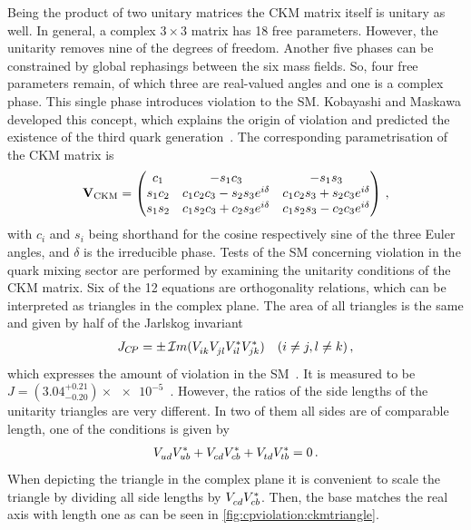 Being the product of two unitary matrices the CKM matrix itself is unitary as
well. In general, a complex $3\times3$ matrix has 18 free parameters. However,
the unitarity removes nine of the degrees of freedom. Another five phases can
be constrained by global rephasings between the six mass fields. So, four free
parameters remain, of which three are real-valued angles and one is a complex
phase. This single phase introduces \CP violation to the SM. Kobayashi and
Maskawa developed this concept, which explains the origin of \CP violation and
predicted the existence of the third quark generation~\cite{Kobayashi:1973fv}.
The corresponding parametrisation of the CKM matrix is
\begin{align}
\mathbf{V}_{\text{CKM}} =
\begin{pmatrix}
c_1 & -s_1c_3 & -s_1s_3 \\
s_1c_2 & c_1c_2c_3 - s_2s_3e^{i\delta} & c_1c_2s_3 + s_2c_3e^{i\delta} \\
s_1s_2 & c_1s_2c_3 + c_2s_3e^{i\delta} & c_1s_2s_3 - c_2c_3e^{i\delta}
\end{pmatrix}
\,,
\end{align}
with $c_i$ and $s_i$ being shorthand for the cosine respectively sine of the
three Euler angles, and $\delta$ is the irreducible phase. Tests of the SM
concerning \CP violation in the quark mixing sector are performed by examining
the unitarity conditions of the CKM matrix. Six of the 12 equations are
orthogonality relations, which can be interpreted as triangles in the complex
plane. The area of all triangles is the same and given by half of the Jarlskog
invariant
\begin{align}
	J_{{C\!P}} = \pm\,\mathcal{I}m (V_{ik}^{}V_{jl}^{}V_{il}^{\ast}V_{jk}^{\ast}) \quad (i \neq j, l \neq k)\,,
\end{align}
which expresses the amount of \CP violation in the
SM~\cite{Jarlskog:1985ht,*Jarlskog:1985cw}. It is measured to be $J = (3.04
^{+0.21}_{-0.20}) \times\num{e-5}$~\cite{PDG2016}. However, the ratios of the
side lengths of the unitarity triangles are very different. In two of them all
sides are of comparable length, one of the conditions is given by
\begin{align}
	{\ensuremath{V_{{u}{d}}^{}}}{\ensuremath{V_{{u}{b}}^\ast}} + {V_{{c}{d}}^{}}{V_{{c}{b}}^\ast} + {V_{{t}{d}}^{}}{V_{{t}{b}}^\ast} = 0\,.
\end{align}
When depicting the triangle in the complex plane it is convenient to scale the
triangle by dividing all side lengths by ${V_{{c}{d}}^{}}{V_{{c}{b}}^\ast}$. Then, the base matches
the real axis with length one as can be seen in
\cref{fig:cpviolation:ckmtriangle}.
